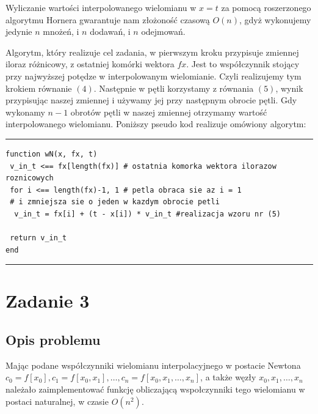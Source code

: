 \documentclass[]{article}
\begin{document}
Wyliczanie wartości interpolowanego wielomianu w $x = t$ za pomocą roszerzonego algorytmu  Hornera gwarantuje nam złożoność czasową $O(n)$, gdyż wykonujemy jedynie $n$ mnożeń, i $n$ dodawań, i $n$ odejmowań.

Algorytm, który realizuje cel zadania, w pierwszym kroku przypisuje zmiennej iloraz różnicowy, z ostatniej komórki wektora $fx$. Jest to współczynnik stojący przy najwyższej potędze w interpolowanym wielomianie. Czyli realizujemy tym krokiem równanie $(4)$. Następnie w pętli korzystamy z równania $(5)$, wynik przypisując naszej zmiennej i używamy jej przy następnym obrocie pętli. Gdy wykonamy $n-1$ obrotów pętli w naszej zmiennej otrzymamy wartość interpolowanego wielomianu. Poniższy pseudo kod realizuje omówiony algorytm:    
\\
\hrule
\begin{lstlisting}
function wN(x, fx, t)
 v_in_t <== fx[length(fx)] # ostatnia komorka wektora ilorazow roznicowych
 for i <== length(fx)-1, 1 # petla obraca sie az i = 1
 # i zmniejsza sie o jeden w kazdym obrocie petli
  v_in_t = fx[i] + (t - x[i]) * v_in_t #realizacja wzoru nr (5) 
 
 return v_in_t 
end
\end{lstlisting}
\hrule
\section{Zadanie 3}
\subsection{Opis problemu}
Mając podane współczynniki wielomianu interpolacyjnego w postacie Newtona $c_0 = f[x_0], c_1 = f[x_0, x_1], \ldots, c_n = f[x_0, x_1, \ldots, x_n]$, a także węzły $x_0, x_1, \ldots, x_n$ należało zaimplementować funkcję obliczającą wspołczynniki tego wielomianu w postaci naturalnej, w czasie $O(n^2)$. 
\end{document}
